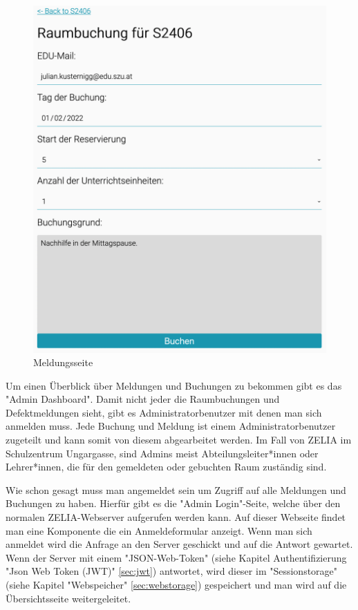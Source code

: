 \begin{figure}[H]
    \centering
    \includegraphics[width=120mm]{media/WebComponents/Buchungsseite_light.png}
    \caption{Meldungsseite}
\end{figure}


\label{sec:webcomplogdash}

Um einen Überblick über Meldungen und Buchungen zu bekommen gibt es das "Admin Dashboard". Damit nicht jeder die Raumbuchungen und Defektmeldungen sieht, gibt es Administratorbenutzer mit denen man sich anmelden muss. Jede Buchung und Meldung ist einem Administratorbenutzer zugeteilt und kann somit von diesem abgearbeitet werden. Im Fall von ZELIA im Schulzentrum Ungargasse, sind Admins meist Abteilungsleiter*innen oder Lehrer*innen, die für den gemeldeten oder gebuchten Raum zuständig sind. 

Wie schon gesagt muss man angemeldet sein um Zugriff auf alle Meldungen und Buchungen zu haben. Hierfür gibt es die "Admin Login"-Seite, welche über den normalen ZELIA-Webserver aufgerufen werden kann. Auf dieser Webseite findet man eine Komponente die ein Anmeldeformular anzeigt. Wenn man sich anmeldet wird die Anfrage an den Server geschickt und auf die Antwort gewartet. Wenn der Server mit einem "JSON-Web-Token" (siehe Kapitel Authentifizierung "Json Web Token (JWT)" \ref{sec:jwt}) antwortet, wird dieser im "Sessionstorage" (siehe Kapitel "Webspeicher" \ref{sec:webstorage}) gespeichert und man wird auf die Übersichtsseite weitergeleitet.

